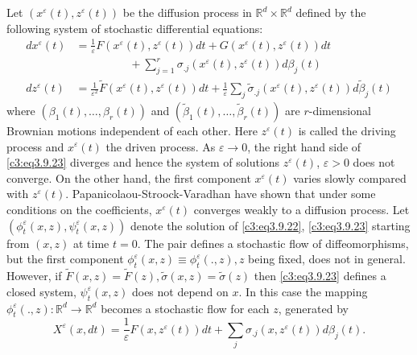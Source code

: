 \setcounter{example}{1}
\begin{example}\label{c3:exam3.9.2} %
  Let $(x^\varepsilon (t), z^\varepsilon (t))$ be the diffusion process in
  $\mathbb{R}^d \times \mathbb{R}^d$ defined by the following system
  of stochastic differential equations:  
  \begin{align*}
    dx^\varepsilon (t) & = \frac{1}{\varepsilon}F(x^\varepsilon
    (t),z^\varepsilon (t))dt + G(x^\varepsilon 
    (t),z^\varepsilon (t))dt\\ 
    & \hspace{2cm} + \sum ^r_{j=1} \sigma_{.j} (x^\varepsilon (t),z^\varepsilon
    (t))d \beta _j (t) \tag{3.9.22}\label{c3:eq3.9.22}\\
    dz^\varepsilon (t) & =
    \frac{1}{\varepsilon^2}\tilde{F}(x^\varepsilon (t),z^\varepsilon
    (t))dt +   \frac{1}{\varepsilon}\sum_j \tilde {\sigma}_{.j}
    (x^\varepsilon (t),z^\varepsilon (t))d   \tilde {\beta}_j (t)
    \tag{3.9.23}\label{c3:eq3.9.23}  
  \end{align*}\pageoriginale
  where $(\beta _1 (t), \ldots, \beta_r(t))$ and $(\tilde{\beta}_1
  (t), \ldots, \tilde{\beta}_r(t))$ are $r$-dimensional Brownian
  motions independent of each other. Here $z^\varepsilon (t)$ is called the
  driving process and $x^\varepsilon(t)$ the driven process. As $\varepsilon \to 0$,
  the right hand side of \eqref{c3:eq3.9.23} diverges and hence the system of
  solutions $z^\varepsilon (t)$, $\varepsilon >0$ does not converge. On the other hand,
  the first component $x^ \varepsilon (t)$ varies slowly compared with $z^\varepsilon
  (t)$. Papanicolaou-Stroock-Varadhan have shown that under some
  conditions on the coefficients, $x ^\varepsilon (t)$ converges weakly to a
  diffusion process. Let $(\phi ^\varepsilon _t(x,z), \psi ^\varepsilon _t (x,z))$
  denote the solution of \eqref{c3:eq3.9.22}, \eqref{c3:eq3.9.23} starting from $(x,z)$ at
  time $t=0$. The pair defines a stochastic flow of diffeomorphisms,
  but the first component $\phi ^\varepsilon _t (x,z)\equiv \phi^\varepsilon
  _t(.,z),z$ being fixed, does not in general. However, if $\tilde
  {F}(x,z) = \tilde{F}(z), \tilde{\sigma}(x,z) = \tilde{\sigma}(z)$
  then \eqref{c3:eq3.9.23} defines a 
  closed system, $\psi^\varepsilon_t (x,z)$ does not depend on $x$. In this
  case the mapping $\phi^\varepsilon_t (.,z): \mathbb{R}^d \to \mathbb{R}^d$
  becomes a stochastic flow for each $z$, generated by 
  \begin{equation*}
    X^\varepsilon (x,dt)=\frac{1}{\varepsilon}F(x,z^\varepsilon (t))dt + \sum _j \sigma
    _{.j}(x,z^\varepsilon (t))d \beta_j (t). 
\tag{3.9.24}\label{c3:eq3.9.24} 
  \end{equation*}  
\end{example}

